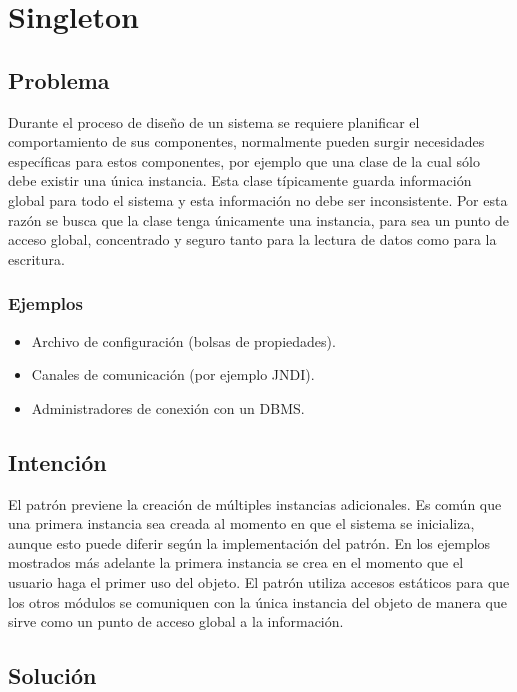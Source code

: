 \documentclass[12pt]{book}
\begin{document}
\section{Singleton}

\subsection{Problema}

Durante el proceso de diseño de un sistema se requiere planificar el comportamiento de sus componentes, normalmente pueden surgir necesidades específicas para estos componentes, por ejemplo que una clase de la cual sólo debe existir una única instancia. Esta clase típicamente guarda información global para todo el sistema y esta información no debe ser inconsistente. Por esta razón se busca que la clase tenga únicamente una instancia, para sea un punto de acceso global, concentrado y seguro tanto para la lectura de datos como para la escritura.


\subsubsection{Ejemplos}

\begin{itemize}
    \item Archivo de configuración (bolsas de propiedades).
    \item Canales de comunicación (por ejemplo JNDI).
    \item Administradores de conexión con un DBMS.
\end{itemize}

\subsection{Intención}

El patrón previene la creación de múltiples instancias adicionales. Es común que una primera instancia sea creada al momento en que el sistema se inicializa, aunque esto puede diferir según la implementación del patrón. En los ejemplos mostrados más adelante la primera instancia se crea en el momento que el usuario haga el primer uso del objeto.
El patrón utiliza accesos estáticos para que los otros módulos se comuniquen con la única instancia del objeto de manera que sirve como un punto de acceso global a la información.


\newpage
\subsection{Solución}
\end{document}
